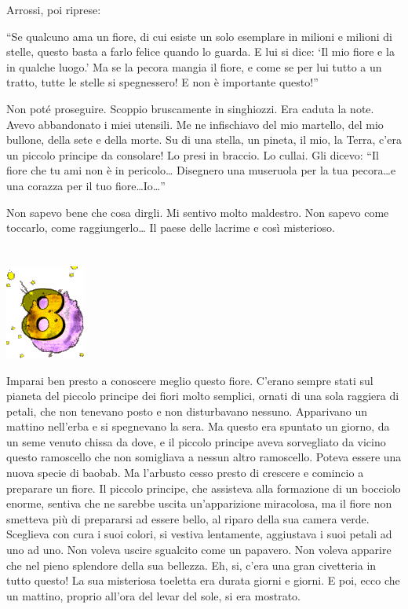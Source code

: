 \documentclass[11pt]{scrbook}
\begin{document}
Arrossi, poi riprese:

``Se qualcuno ama un fiore, di cui esiste un solo esemplare in milioni e
milioni di stelle, questo basta a farlo felice quando lo guarda. E lui
si dice: `Il mio fiore e la in qualche luogo.' Ma se la pecora mangia il
fiore, e come se per lui tutto a un tratto, tutte le stelle si
spegnessero! E non è importante questo!''

Non poté proseguire. Scoppio bruscamente in singhiozzi. Era caduta la
note. Avevo abbandonato i miei utensili. Me ne infischiavo del mio
martello, del mio bullone, della sete e della morte. Su di una stella,
un pineta, il mio, la Terra, c'era un piccolo principe da consolare! Lo
presi in braccio. Lo cullai. Gli dicevo: ``Il fiore che tu ami non è in
pericolo\ldots{} Disegnero una museruola per la tua pecora\ldots{}e una
corazza per il tuo fiore\ldots{}Io\ldots{}''

Non sapevo bene che cosa dirgli. Mi sentivo molto maldestro. Non sapevo
come toccarlo, come raggiungerlo\ldots{} Il paese delle lacrime e così
misterioso.

\chapter{}
\begin{center}
\includegraphics{img/chapter8}
\end{center}

Imparai ben presto a conoscere meglio questo fiore. C'erano sempre stati
sul pianeta del piccolo principe dei fiori molto semplici, ornati di una
sola raggiera di petali, che non tenevano posto e non disturbavano
nessuno. Apparivano un mattino nell'erba e si spegnevano la sera. Ma
questo era spuntato un giorno, da un seme venuto chissa da dove, e il
piccolo principe aveva sorvegliato da vicino questo ramoscello che non
somigliava a nessun altro ramoscello. Poteva essere una nuova specie di
baobab. Ma l'arbusto cesso presto di crescere e comincio a preparare un
fiore. Il piccolo principe, che assisteva alla formazione di un bocciolo
enorme, sentiva che ne sarebbe uscita un'apparizione miracolosa, ma il
fiore non smetteva più di prepararsi ad essere bello, al riparo della
sua camera verde. Sceglieva con cura i suoi colori, si vestiva
lentamente, aggiustava i suoi petali ad uno ad uno. Non voleva uscire
sgualcito come un papavero. Non voleva apparire che nel pieno splendore
della sua bellezza. Eh, si, c'era una gran civetteria in tutto questo!
La sua misteriosa toeletta era durata giorni e giorni. E poi, ecco che
un mattino, proprio all'ora del levar del sole, si era mostrato.
\end{document}
